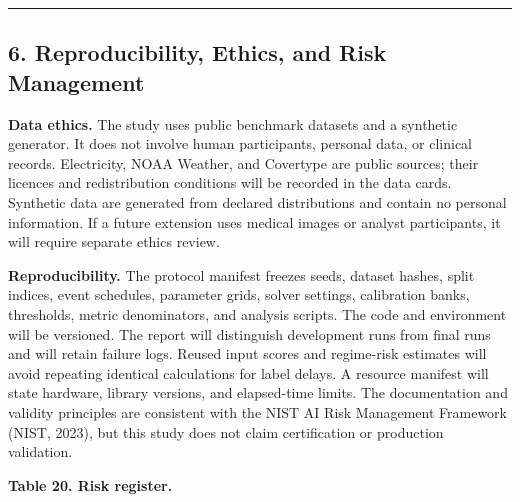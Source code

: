 \documentclass[
]{article}
\begin{document}
\begin{center}\rule{0.5\linewidth}{0.5pt}\end{center}

\hypertarget{reproducibility-ethics-and-risk-management}{%
\subsection{6. Reproducibility, Ethics, and Risk
Management}\label{reproducibility-ethics-and-risk-management}}

\textbf{Data ethics.} The study uses public benchmark datasets and a
synthetic generator. It does not involve human participants, personal
data, or clinical records. Electricity, NOAA Weather, and Covertype are
public sources; their licences and redistribution conditions will be
recorded in the data cards. Synthetic data are generated from declared
distributions and contain no personal information. If a future extension
uses medical images or analyst participants, it will require separate
ethics review.

\textbf{Reproducibility.} The protocol manifest freezes seeds, dataset
hashes, split indices, event schedules, parameter grids, solver
settings, calibration banks, thresholds, metric denominators, and
analysis scripts. The code and environment will be versioned. The report
will distinguish development runs from final runs and will retain
failure logs. Reused input scores and regime-risk estimates will avoid
repeating identical calculations for label delays. A resource manifest
will state hardware, library versions, and elapsed-time limits. The
documentation and validity principles are consistent with the NIST AI
Risk Management Framework (NIST, 2023), but this study does not claim
certification or production validation.

\textbf{Table 20. Risk register.}
\end{document}
